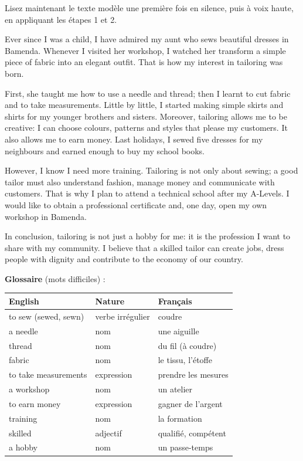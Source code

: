 \documentclass[11pt]{article}
\begin{document}
Lisez maintenant le texte modèle une première fois en silence, puis à voix haute, en appliquant les étapes 1 et 2.

\begin{textebox}
Ever since I was a child, I have admired my aunt who sews beautiful dresses in Bamenda. Whenever I visited her workshop, I watched her transform a simple piece of fabric into an elegant outfit. That is how my interest in tailoring was born.

First, she taught me how to use a needle and thread; then I learnt to cut fabric and to take measurements. Little by little, I started making simple skirts and shirts for my younger brothers and sisters. Moreover, tailoring allows me to be creative: I can choose colours, patterns and styles that please my customers. It also allows me to earn money. Last holidays, I sewed five dresses for my neighbours and earned enough to buy my school books.

However, I know I need more training. Tailoring is not only about sewing; a good tailor must also understand fashion, manage money and communicate with customers. That is why I plan to attend a technical school after my A-Levels. I would like to obtain a professional certificate and, one day, open my own workshop in Bamenda.

In conclusion, tailoring is not just a hobby for me: it is the profession I want to share with my community. I believe that a skilled tailor can create jobs, dress people with dignity and contribute to the economy of our country.
\end{textebox}

\textbf{Glossaire} (mots difficiles) :

\begin{center}
\begin{tabularx}{\linewidth}{|l|l|X|}
\hline
\rowcolor{popblueL} \textbf{English} & \textbf{Nature} & \textbf{Français} \\
\hline
to sew (sewed, sewn) & verbe irrégulier & coudre \\
\hline
a needle & nom & une aiguille \\
\hline
thread & nom & du fil (à coudre) \\
\hline
fabric & nom & le tissu, l'étoffe \\
\hline
to take measurements & expression & prendre les mesures \\
\hline
a workshop & nom & un atelier \\
\hline
to earn money & expression & gagner de l'argent \\
\hline
training & nom & la formation \\
\hline
skilled & adjectif & qualifié, compétent \\
\hline
a hobby & nom & un passe-temps \\
\hline
\end{tabularx}
\end{center}
\end{document}
